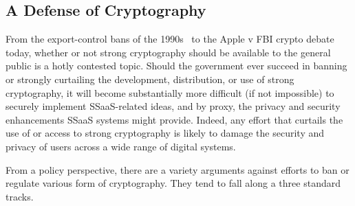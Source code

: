 \subsection{A Defense of Cryptography}

From the export-control bans of the 1990s~\cite{kehl2015} to the Apple
v FBI crypto debate today, whether or not strong cryptography should
be available to the general public is a hotly contested topic. Should
the government ever succeed in banning or strongly curtailing the
development, distribution, or use of strong cryptography, it will
become substantially more difficult (if not impossible) to securely
implement SSaaS-related ideas, and by proxy, the privacy and security
enhancements SSaaS systems might provide. Indeed, any effort that
curtails the use of or access to strong cryptography is likely to
damage the security and privacy of users across a wide range of
digital systems.

From a policy perspective, there are a variety arguments against
efforts to ban or regulate various form of cryptography. They tend to
fall along a three standard tracks.


